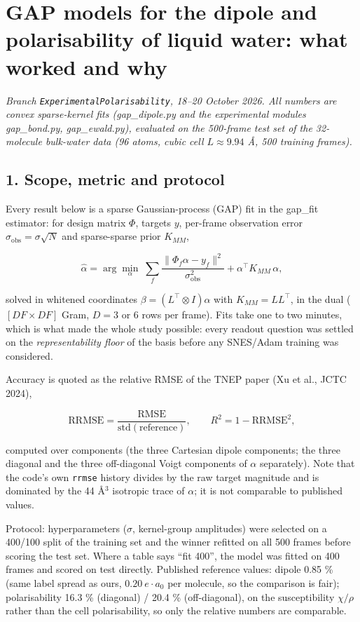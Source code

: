 \documentclass[
  10pt,
]{article}
\author{}
\date{}
\begin{document}
\section{GAP models for the dipole and polarisability of liquid water: what worked and
why}\label{gap-models-for-the-dipole-and-polarisability-of-liquid-water-what-worked-and-why}

\emph{Branch \texttt{ExperimentalPolarisability}, 18--20 October 2026. All numbers are convex
sparse-kernel fits (gap\_dipole.py and the experimental modules gap\_bond.py, gap\_ewald.py),
evaluated on the 500-frame test set of the 32-molecule bulk-water data (96 atoms, cubic cell
\(L \approx 9.94\) \AA{}, 500 training frames).}

\subsection{1. Scope, metric and protocol}\label{scope-metric-and-protocol}

Every result below is a sparse Gaussian-process (GAP) fit in the gap\_fit estimator: for design
matrix \(\Phi\), targets \(y\), per-frame observation error \(\sigma_\mathrm{obs} = \sigma\sqrt{N}\)
and sparse-sparse prior \(K_{MM}\),

\[
\hat\alpha = \arg\min_\alpha \; \sum_f \frac{\lVert \Phi_f\alpha - y_f\rVert^2}{\sigma_\mathrm{obs}^2} + \alpha^\top K_{MM}\,\alpha ,
\]

solved in whitened coordinates \(\beta = (L^\top\!\otimes I)\alpha\) with \(K_{MM}=LL^\top\), in the
dual (\([DF\times DF]\) Gram, \(D=3\) or \(6\) rows per frame). Fits take one to two minutes, which
is what made the whole study possible: every readout question was settled on the
\emph{representability floor} of the basis before any SNES/Adam training was considered.

Accuracy is quoted as the relative RMSE of the TNEP paper (Xu et al., JCTC 2024),

\[
\mathrm{RRMSE} = \frac{\mathrm{RMSE}}{\mathrm{std}(\text{reference})},\qquad R^2 = 1-\mathrm{RRMSE}^2 ,
\]

computed over components (the three Cartesian dipole components; the three diagonal and the three
off-diagonal Voigt components of \(\alpha\) separately). Note that the code's own \texttt{rrmse}
history divides by the raw target magnitude and is dominated by the 44 \AA{}\(^3\) isotropic trace
of \(\alpha\); it is not comparable to published values.

Protocol: hyperparameters (\(\sigma\), kernel-group amplitudes) were selected on a 400/100 split of
the training set and the winner refitted on all 500 frames before scoring the test set. Where a
table says ``fit 400'', the model was fitted on 400 frames and scored on test directly. Published
reference values: dipole 0.85 \% (same label spread as ours, \(0.20\ e\cdot a_0\) per molecule, so
the comparison is fair); polarisability 16.3 \% (diagonal) / 20.4 \% (off-diagonal), on the
susceptibility \(\chi/\rho\) rather than the cell polarisability, so only the relative numbers are
comparable.
\end{document}
